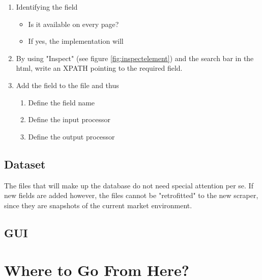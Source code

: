 \documentclass[main]{subfiles}
\begin{document}
\begin{enumerate}
    \item Identifying the field
    \begin{itemize}
        \item Is it available on every page?
        \item If yes, the implementation will 
    \end{itemize}
    \item By using "Inspect" (see figure \ref{fig:inspectelement}) and the search bar in the \acs*{html}, write an XPATH pointing to the required field.
    \item Add the field to the \pkg[items.py] file and thus
    \begin{enumerate}
        \item Define the field name
        \item Define the input processor
        \item Define the output processor
    \end{enumerate}
\end{enumerate}



\subsection{Dataset}
The \pkg[.csv] files that will make up the database do not need special attention per se.
If new fields are added however, the files cannot be "retrofitted" to the new scraper, 
since they are snapshots of the current market environment.

\subsection{GUI}

\section{Where to Go From Here?}
\end{document}
